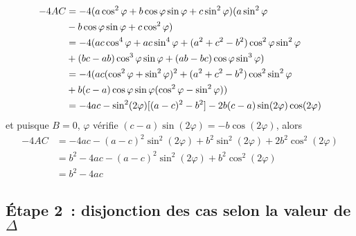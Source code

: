 \begin{align}
  -4AC&=-4(a\cos^2\varphi+b\cos\varphi\sin\varphi 
  +c\sin^2\varphi)(a\sin^2\varphi \\ &- b\cos\varphi\sin\varphi 
  +c\cos^2\varphi) \notag\\
                                     &=-4(ac\cos^4\varphi + 
  ac\sin^4\varphi+(a^2+c^2-b^2)\cos^2\varphi\sin^2\varphi\\ & 
  +(bc-ab)\cos^3\varphi\sin\varphi+(ab-bc)\cos\varphi\sin^3\varphi) \notag\\
                                                            &=-4(ac(\cos^2\varphi+\sin^2\varphi)^2+(a^2+c^2-b^2)\cos^2\sin^2\varphi 
                                                         \\ & 
                                                         +b(c-a)\cos\varphi\sin\varphi(\cos^2\varphi-\sin^2\varphi)) 
                                                         \notag\\
                                                            &=-4ac-\sin^2(2\varphi)[(a-c)^2-b^2]-2b(c-a)\sin(2\varphi)\cos(2\varphi)
\end{align}
et puisque \(B=0\), \(\varphi\) vérifie 
\((c-a)\sin(2\varphi)=-b\cos(2\varphi)\), alors
\begin{align}
  -4AC&=-4ac-(a-c)^2\sin^2(2\varphi)+b^2\sin^2(2\varphi)+2b^2\cos^2(2\varphi)\\
      &=b^2-4ac-(a-c)^2\sin^2(2\varphi)+b^2\cos^2(2\varphi)\\
      &=b^2-4ac
\end{align}

\subsection{Étape 2~: disjonction des cas selon la valeur de \(\Delta\)}
